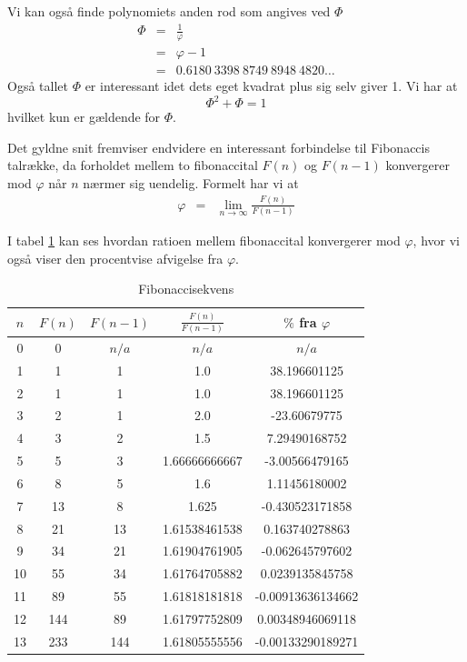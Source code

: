 {Vi kan også finde polynomiets anden rod som angives ved $\varPhi$
\begin{eqnarray*}
	\varPhi & = & \frac{1}{\varphi} \\
		& = & \varphi - 1 \\
		& = & 0.6180\ 3398\ 8749\ 8948\ 4820 \dots
\end{eqnarray*}
Også tallet $\varPhi$ er interessant idet dets eget kvadrat plus sig
selv giver 1. Vi har at
\begin{equation}
	\varPhi^{2} + \varPhi = 1
	\label{Phi_squared}
\end{equation}
hvilket kun er gældende for $\varPhi$.

Det gyldne snit fremviser endvidere en interessant forbindelse til
Fibonaccis talrække, da forholdet mellem to fibonaccital $F(n)$ og $F(n
- 1)$ konvergerer mod $\varphi$ når $n$ nærmer sig uendelig. Formelt har
vi at
\begin{eqnarray*}
	\varphi & =     & \lim_{n \rightarrow\infty}{\frac{F(n)}{F(n - 1)}}
\end{eqnarray*}

I tabel \ref{fibonacci_sequence} kan ses hvordan ratioen mellem
fibonaccital konvergerer mod $\varphi$, hvor vi også viser den
procentvise afvigelse fra $\varphi$.

\begin{table}[h!]
    \centering
    \begin{tabular}{|c|c|c|c|c|}
        \hline
        $n$ & $F(n)$ & $F(n - 1)$ & $ \frac{F(n)}{F(n - 1)}$ & $\%$ fra $\varphi$ \\
        \hline
        0	 & 0 	 & $n/a$ & $n/a$ 		& $n/a$ 		\\
        1	 & 1	 & 1	 & 1.0		 	& 38.196601125 		\\
        2	 & 1	 & 1	 & 1.0		 	& 38.196601125 		\\
        3	 & 2	 & 1	 & 2.0		 	& -23.60679775 		\\
        4	 & 3	 & 2	 & 1.5			& 7.29490168752 	\\
        5	 & 5	 & 3	 & 1.66666666667	& -3.00566479165 	\\
        6	 & 8	 & 5	 & 1.6			& 1.11456180002 	\\
        7	 & 13	 & 8	 & 1.625	 	& -0.430523171858 	\\
        8	 & 21	 & 13	 & 1.61538461538	& 0.163740278863 	\\
        9	 & 34	 & 21	 & 1.61904761905	& -0.062645797602 	\\
        10	 & 55	 & 34	 & 1.61764705882	& 0.0239135845758 	\\
        11	 & 89	 & 55	 & 1.61818181818	& -0.00913636134662 	\\
        12	 & 144	 & 89	 & 1.61797752809	& 0.00348946069118 	\\
        13	 & 233	 & 144	 & 1.61805555556	& -0.00133290189271 	\\
        \hline
    \end{tabular}
    \caption{Fibonaccisekvens}
    \label{fibonacci_sequence}
\end{table}

}

